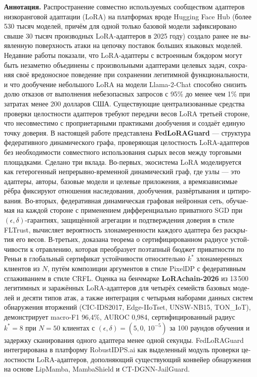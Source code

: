 \documentclass[12pt,a4paper]{article}
\theoremstyle{definition}
\theoremstyle{remark}
\begin{document}
\begin{otherlanguage}{russian}
\noindent\textbf{Аннотация.} Распространение совместно используемых сообществом адаптеров низкоранговой адаптации (LoRA) на платформах вроде Hugging Face Hub (более 530 тысяч моделей, причём для одной только базовой модели зафиксировано свыше 30 тысяч производных LoRA-адаптеров в 2025 году) создало ранее не выявленную поверхность атаки на цепочку поставок больших языковых моделей. Недавние работы показали, что LoRA-адаптеры с встроенным бэкдором могут быть незаметно объединены с произвольными адаптерами целевых задач, сохраняя своё вредоносное поведение при сохранении легитимной функциональности, и что дообучение небольшого LoRA на модели Llama-2-Chat способно снизить долю отказов от выполнения небезопасных запросов с 95\% до менее чем 1\% при затратах менее 200 долларов США. Существующие централизованные средства проверки целостности адаптеров требуют передачи весов LoRA третьей стороне, что несовместимо с проприетарными практиками дообучения и создаёт единую точку доверия. В настоящей работе представлена \textbf{FedLoRAGuard} --- структура федеративного динамического графа, проверяющая целостность LoRA-адаптеров без необходимости совместного использования сырых весов между торговыми площадками. Сделано три вклада. Во-первых, экосистема LoRA моделируется как гетерогенный непрерывно-временной динамический граф, где узлы --- это адаптеры, авторы, базовые модели и целевые приложения, а времязависимые рёбра фиксируют отношения наследования, дообучения, развёртывания и цитирования. Во-вторых, федеративная динамическая графовая нейронная сеть, обучаемая на каждой стороне с применением дифференциально приватного SGD при $(\epsilon,\delta)$-гарантиях, защищённой агрегации и подтверждения доверия в стиле FLTrust, вычисляет вероятность злонамеренности каждого адаптера без раскрытия его весов. В-третьих, доказана теорема о сертифицированном радиусе устойчивости к отравлению, которая преобразует поэтапный бюджет приватности по Реньи в глобальный сертификат устойчивости относительно $k^*$ злонамеренных клиентов из $N$, путём композиции аргументов в стиле PixelDP с федеративным сглаживанием в стиле CRFL. Оценка на бенчмарке \textbf{LoRAchain-2026} из 13\,500 легитимных и заражённых LoRA-адаптеров для четырёх семейств базовых моделей и десяти типов атак, а также интеграция с четырьмя наборами данных систем обнаружения вторжений (CIC-IDS2017, Edge-IIoTset, UNSW-NB15, TON\_IoT), демонстрирует macro-F1 96{,}4\%, AUROC 0{,}984, сертифицированный радиус $k^* = 8$ при $N = 50$ клиентах с $(\epsilon, \delta) = (5{,}0,\, 10^{-5})$ за 100 раундов обучения и задержку сканирования одного адаптера менее одной секунды. FedLoRAGuard интегрирована в платформу RobustIDPS.ai как выделенный модуль проверки целостности LoRA-адаптеров, дополняющий существующий конвейер обнаружения на основе LipMamba, MambaShield и CT-DGNN-JailGuard.


\end{otherlanguage}
\end{document}
